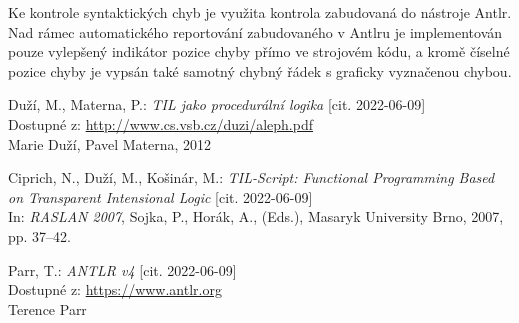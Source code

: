 \documentclass{article}
\begin{document}
Ke kontrole syntaktických chyb je využita kontrola zabudovaná do nástroje Antlr. Nad rámec automatického
reportování zabudovaného v Antlru je implementován pouze vylepšený indikátor pozice chyby přímo
ve strojovém kódu, a kromě číselné pozice chyby je vypsán také samotný chybný řádek s graficky vyznačenou
chybou.

\begin{thebibliography}{50}

Duží, M., Materna, P.: \textit{TIL jako procedurální logika} [cit. 2022-06-09] \\
Dostupné z: \url{http://www.cs.vsb.cz/duzi/aleph.pdf} \\
Marie Duží, Pavel Materna, 2012

Ciprich, N., Duží, M., Košinár, M.: \textit{TIL-Script: Functional Programming Based on
Transparent Intensional Logic} [cit. 2022-06-09] \\
In: \textit{RASLAN 2007}, Sojka, P., Horák, A., (Eds.), Masaryk University Brno, 2007, pp. 37–42.

Parr, T.: \textit{ANTLR v4} [cit. 2022-06-09] \\
Dostupné z: \url{https://www.antlr.org} \\
Terence Parr

\end{thebibliography}
\end{document}
